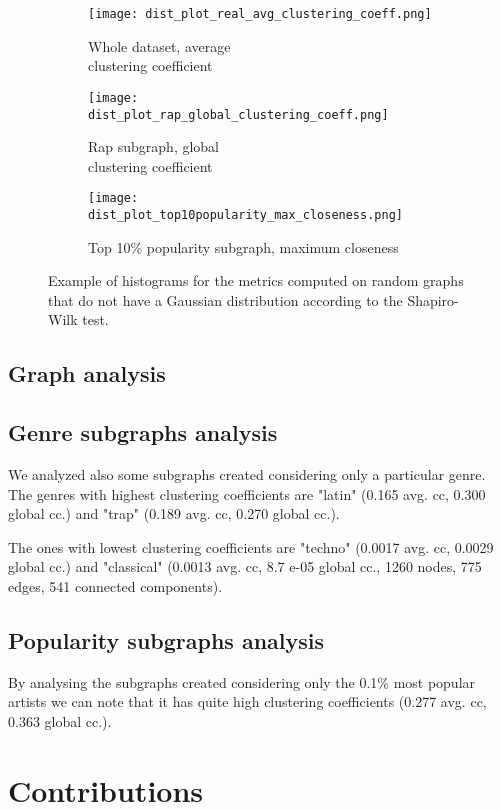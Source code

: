 \documentclass[a4paper, 12pt, conference]{ieeeconf}      %
\begin{document}
  \begin{figure*}
      \centering
      \begin{subfigure}{.33\textwidth}
        \centering
        \captionsetup{justification=centering}
        \texttt{[image: dist\_plot\_real\_avg\_clustering\_coeff.png]}
        \caption{Whole dataset, average \\ clustering coefficient}
        \label{fig:hist1}
      \end{subfigure}%
      \begin{subfigure}{.33\textwidth}
        \centering
        \captionsetup{justification=centering}
        \texttt{[image: dist\_plot\_rap\_global\_clustering\_coeff.png]}
        \caption{Rap subgraph, global \\ clustering coefficient}
        \label{fig:hist2}
      \end{subfigure}
      \begin{subfigure}{.33\textwidth}
        \centering
        \captionsetup{justification=centering}
        \texttt{[image: dist\_plot\_top10popularity\_max\_closeness.png]}
        \caption{Top 10\% popularity subgraph, maximum closeness}
        \label{fig:hist3}
      \end{subfigure}
      \caption{Example of histograms for the metrics computed on random graphs that do not have a Gaussian distribution according to the Shapiro-Wilk test.}
      \label{fig:test}
  \end{figure*}
  
\subsection{Graph analysis}

\subsection{Genre subgraphs analysis}
We analyzed also some subgraphs created considering only a particular genre.
The genres with highest clustering coefficients are "latin" (0.165 avg. cc,  0.300 global cc.) 
and "trap" (0.189 avg. cc,  0.270 global cc.).

The ones with lowest clustering coefficients are "techno" (0.0017 avg. cc,  0.0029 global cc.)  
and "classical" (0.0013 avg. cc,  8.7 e-05 global cc., 1260 nodes, 775 edges, 541 
connected components).


\subsection{Popularity subgraphs analysis}



By analysing the subgraphs created considering only the 0.1\% most popular artists we can 
note that it has quite high clustering coefficients (0.277 avg. cc,  0.363 global cc.).





\section*{Contributions}

\printbibliography[nottype=online]
\end{document}
